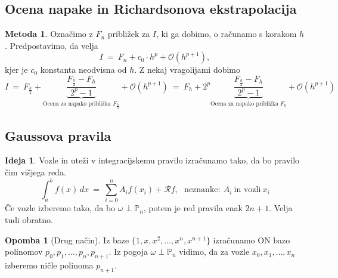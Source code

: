 \documentclass[11pt]{article}
\newcommand{\p}{\mathbb{P}}
\newcommand{\rr}{\mathcal{R}}
\newcommand{\OO}{\mathcal{O}}
\theoremstyle{definition}
\theoremstyle{definition}
\newtheorem*{opomba}{Opomba}
\newtheorem*{metoda}{Metoda}
\newtheorem*{ideja}{Ideja}
\begin{document}

\subsection{Ocena napake in Richardsonova ekstrapolacija}
\vspace{0.5cm}

\begin{metoda}

Označimo z $F_n$ približek za $I$, ki ga dobimo, o računamo s korakom $h$. Predpostavimo, da velja
$$I ~=~ F_n + c_0 \cdot h^p + \OO(h^{p+1}),$$
kjer je $c_0$ konstanta neodvisna od $h$. Z nekaj vragolijami dobimo
$$I ~=~ F_{\frac{h}{2}} + \underbrace{\frac{F_{\frac{h}{2}} - F_h}{2^p - 1}}_{\text{Ocena za napako približka $F_{\frac{h}{2}}$}} + \OO(h^{p+1}) ~=~ F_{h} + 2^p \underbrace{\frac{F_{\frac{h}{2}} - F_h}{2^p - 1}}_{\text{Ocena za napako približka $F_h$}} + \OO(h^{p+1})$$

\end{metoda}
\vspace{0.5cm}


\subsection{Gaussova pravila}
\vspace{0.5cm}

\begin{ideja}

Vozle in uteži v integracijskemu pravilo izračunamo tako, da bo pravilo čim višjega reda.
$$\int_a^b f(x)\,dx ~=~ \sum_{i=0}^n A_i f(x_i) + \rr f, ~~~\text{neznanke}:~ A_i ~\text{in vozli}~ x_i$$
Če vozle izberemo tako, da bo $\omega \perp \p_n$, potem je red pravila enak $2n+1$. Velja tudi obratno.

\end{ideja}
\vspace{0.5cm}

\begin{opomba}[Drug način]

Iz baze $\{ 1, x, x^2, \ldots, x^n, x^{n+1} \}$ izračunamo ON bazo polinomov $p_0, p_1, \ldots, p_n, p_{n+1}$. Iz pogoja $\omega \perp \p_n$ vidimo, da za vozle $x_0, x_1, \ldots, x_n$ izberemo ničle polinoma $p_{n+1}$.

\end{opomba}
\vspace{0.5cm}
\end{document}
